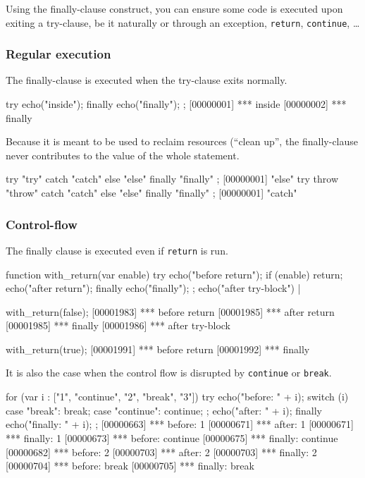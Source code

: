 Using the finally-clause construct, you can ensure some code is executed
upon exiting a try-clause, be it naturally or through an exception,
\lstinline|return|, \lstinline|continue|, \ldots

\subsubsection{Regular execution}

The finally-clause is executed when the try-clause exits normally.

\begin{urbiscript}
try
{
  echo("inside");
}
finally
{
  echo("finally");
};
[00000001] *** inside
[00000002] *** finally
\end{urbiscript}

Because it is meant to be used to reclaim resources (``clean up'', the
finally-clause never contributes to the value of the whole statement.

\begin{urbiscript}
try { "try" } catch { "catch" } else { "else" } finally { "finally" };
[00000001] "else"
try { throw "throw" } catch { "catch" } else { "else" } finally { "finally" };
[00000001] "catch"
\end{urbiscript}


\subsubsection{Control-flow}

The finally clause is executed even if \lstinline|return| is run.

\begin{urbiscript}
function with_return(var enable)
{
  try
  {
    echo("before return");
    if (enable)
      return;
    echo("after return");
  }
  finally
  {
    echo("finally");
  };
  echo("after try-block")
}|

with_return(false);
[00001983] *** before return
[00001985] *** after return
[00001985] *** finally
[00001986] *** after try-block

with_return(true);
[00001991] *** before return
[00001992] *** finally
\end{urbiscript}

It is also the case when the control flow is disrupted by
\lstinline|continue| or \lstinline|break|.

\begin{urbiscript}
for (var i : ["1", "continue", "2", "break", "3"])
  try
  {
    echo("before:  " + i);
    switch (i)
    {
      case "break":    break;
      case "continue": continue;
    };
    echo("after:   " + i);
  }
  finally
  {
    echo("finally: " + i);
  };
[00000663] *** before:  1
[00000671] *** after:   1
[00000671] *** finally: 1
[00000673] *** before:  continue
[00000675] *** finally: continue
[00000682] *** before:  2
[00000703] *** after:   2
[00000703] *** finally: 2
[00000704] *** before:  break
[00000705] *** finally: break
\end{urbiscript}


